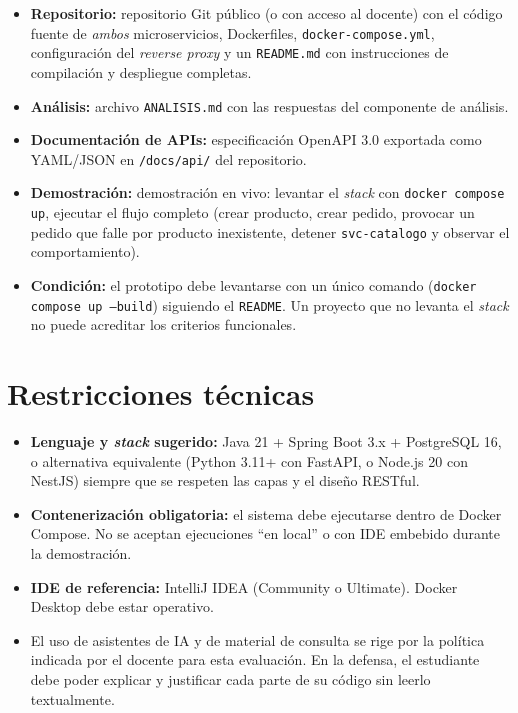 \documentclass[11pt,a4paper]{article}
\begin{document}
\begin{itemize}[leftmargin=1.2em, itemsep=0.25em]
    \item \textbf{Repositorio:} repositorio Git público (o con acceso al docente) con el código fuente de \emph{ambos} microservicios, Dockerfiles, \texttt{docker-compose.yml}, configuración del \emph{reverse proxy} y un \texttt{README.md} con instrucciones de compilación y despliegue completas.
    \item \textbf{Análisis:} archivo \texttt{ANALISIS.md} con las respuestas del componente de análisis.
    \item \textbf{Documentación de APIs:} especificación OpenAPI 3.0 exportada como YAML/JSON en \texttt{/docs/api/} del repositorio.
    \item \textbf{Demostración:} demostración en vivo: levantar el \emph{stack} con \texttt{docker compose up}, ejecutar el flujo completo (crear producto, crear pedido, provocar un pedido que falle por producto inexistente, detener \texttt{svc-catalogo} y observar el comportamiento).
    \item \textbf{Condición:} el prototipo debe levantarse con un único comando (\texttt{docker compose up --build}) siguiendo el \texttt{README}. Un proyecto que no levanta el \emph{stack} no puede acreditar los criterios funcionales.
\end{itemize}

\section{Restricciones técnicas}

\begin{itemize}[leftmargin=1.2em, itemsep=0.25em]
    \item \textbf{Lenguaje y \emph{stack} sugerido:} Java 21 + Spring Boot 3.x + PostgreSQL 16, o alternativa equivalente (Python 3.11+ con FastAPI, o Node.js 20 con NestJS) siempre que se respeten las capas y el diseño RESTful.
    \item \textbf{Contenerización obligatoria:} el sistema debe ejecutarse dentro de Docker Compose. No se aceptan ejecuciones ``en local'' o con IDE embebido durante la demostración.
    \item \textbf{IDE de referencia:} IntelliJ IDEA (Community o Ultimate). Docker Desktop debe estar operativo.
    \item El uso de asistentes de IA y de material de consulta se rige por la política indicada por el docente para esta evaluación. En la defensa, el estudiante debe poder explicar y justificar cada parte de su código sin leerlo textualmente.
\end{itemize}
\end{document}
